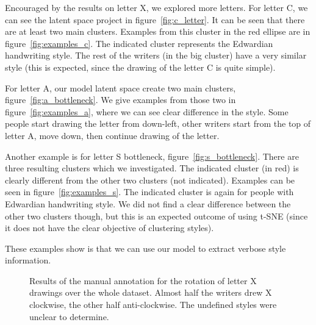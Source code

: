   \par Encouraged by the results on letter X, we explored more letters. For letter C, we can see the latent space project in figure~\ref{fig:c_letter}. It can be seen that there are at least two main clusters. Examples from this cluster in the red ellipse are in figure~\ref{fig:examples_c}. The indicated cluster represents the Edwardian handwriting style. The rest of the writers (in the big cluster) have a very similar style (this is expected, since the drawing of the letter C is quite simple).

  \par For letter A, our model latent space create two main clusters, figure~\ref{fig:a_bottleneck}. We give examples from those two in figure~\ref{fig:examples_a}, where we can see clear difference in the style. Some people start drawing the letter from down-left, other writers start from the top of letter A, move down, then continue drawing of the letter.

  \par Another example is for letter S bottleneck, figure~\ref{fig:s_bottleneck}. There are three resulting clusters which we investigated. The indicated cluster (in red) is clearly different from the other two clusters (not indicated). Examples can be seen in figure~\ref{fig:examples_s}. The indicated cluster is again for people with Edwardian handwriting style. We did not find a clear difference between the other two clusters though, but this is an expected outcome of using t-SNE (since it does not have the clear objective of clustering styles).

  \par These examples show is that we can use our model to extract verbose style information.
  \begin{figure}[htbp!]
      \centering
      \caption{Results of the manual annotation for the rotation of letter X drawings over the whole dataset. Almost half the writers drew X clockwise, the other half anti-clockwise. The undefined styles were unclear to determine.}
      \label{fig:x_rotation}
  \end{figure}

